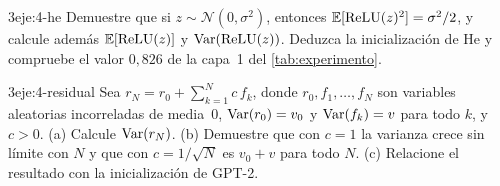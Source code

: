 \begin{ejercicio}{3}{eje:4-he}
Demuestre que si $z\sim\mathcal{N}(0,\sigma^{2})$, entonces $\mathbb{E}[\operatorname{ReLU}(z)^{2}]=\sigma^{2}/2$, y calcule además $\mathbb{E}[\operatorname{ReLU}(z)]$ y $\operatorname{Var}(\operatorname{ReLU}(z))$. Deduzca la inicialización de He y compruebe el valor $0{,}826$ de la capa~1 del \cref{tab:experimento}.
\end{ejercicio}

\begin{ejercicio}{3}{eje:4-residual}
Sea $r_N=r_0+\sum_{k=1}^{N}c\,f_k$, donde $r_0,f_1,\dots,f_N$ son variables aleatorias incorreladas de media~0, $\operatorname{Var}(r_0)=v_0$ y $\operatorname{Var}(f_k)=v$ para todo $k$, y $c>0$. (a) Calcule $\operatorname{Var}(r_N)$. (b) Demuestre que con $c=1$ la varianza crece sin límite con $N$ y que con $c=1/\sqrt N$ es $v_0+v$ para todo $N$. (c) Relacione el resultado con la inicialización de GPT-2.
\end{ejercicio}
